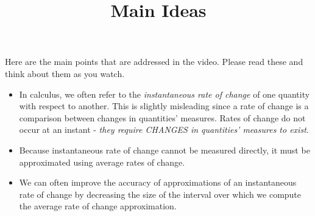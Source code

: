 \documentclass[handout]{ximera}
\title{Main Ideas}
\begin{document}
\begin{abstract}
\end{abstract}

\maketitle

Here are the main points that are addressed in the video. Please read these and think about them as you watch.

\begin{itemize}
\item In calculus, we often refer to the \textit{instantaneous rate of change} of one quantity with respect to another. This is slightly misleading since a rate of change is a comparison between changes in quantities’ measures. Rates of change do not occur at an instant - \textit{they require CHANGES in quantities’ measures to exist}.
\item Because instantaneous rate of change cannot be measured directly, it must be approximated using average rates of change.
\item We can often improve the accuracy of approximations of an instantaneous rate of change by decreasing the size of the interval over which we compute the average rate of change approximation.
\end{itemize}
\end{document}
